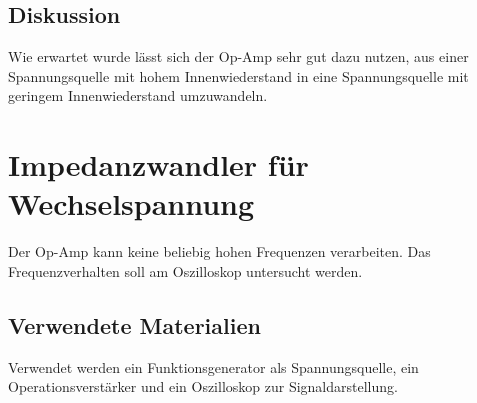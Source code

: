 \documentclass[12pt,a4paper]{article}
\begin{document}
\subsection{Diskussion}

Wie erwartet wurde lässt sich der Op-Amp sehr gut dazu nutzen, aus einer Spannungsquelle mit hohem Innenwiederstand in eine Spannungsquelle mit geringem Innenwiederstand umzuwandeln.

\section{Impedanzwandler für Wechselspannung}
Der Op-Amp kann keine beliebig hohen Frequenzen verarbeiten. Das Frequenzverhalten soll am Oszilloskop untersucht werden.
\subsection{Verwendete Materialien}

Verwendet werden ein Funktionsgenerator als Spannungsquelle, ein Operationsverstärker und ein Oszilloskop zur Signaldarstellung.
\end{document}
